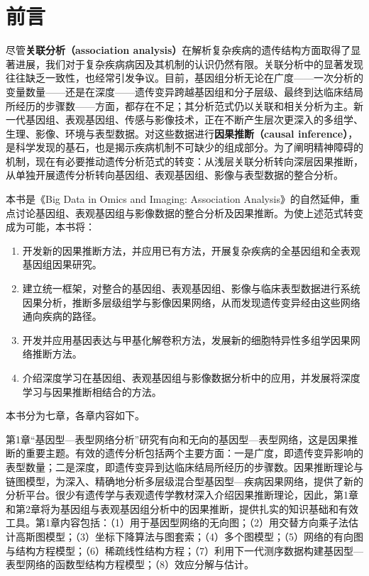 \chapter*{前言}

尽管\textbf{关联分析（association analysis）}在解析复杂疾病的遗传结构方面取得了显著进展，我们对于复杂疾病病因及其机制的认识仍然有限。关联分析中的显著发现往往缺乏一致性，也经常引发争议。目前，基因组分析无论在广度——一次分析的变量数量——还是在深度——遗传变异跨越基因组和分子层级、最终到达临床结局所经历的步骤数——方面，都存在不足；其分析范式仍以关联和相关分析为主。新一代基因组、表观基因组、传感与影像技术，正在不断产生层次更深入的多组学、生理、影像、环境与表型数据。对这些数据进行\textbf{因果推断（causal inference）}，是科学发现的基石，也是揭示疾病机制不可缺少的组成部分。为了阐明精神障碍的机制，现在有必要推动遗传分析范式的转变：从浅层关联分析转向深层因果推断，从单独开展遗传分析转向基因组、表观基因组、影像与表型数据的整合分析。

本书是《Big Data in Omics and Imaging: Association Analysis》的自然延伸，重点讨论基因组、表观基因组与影像数据的整合分析及因果推断。为使上述范式转变成为可能，本书将：
\begin{enumerate}[label=（\arabic*）]
\item 开发新的因果推断方法，并应用已有方法，开展复杂疾病的全基因组和全表观基因组因果研究。
\item 建立统一框架，对整合的基因组、表观基因组、影像与临床表型数据进行系统因果分析，推断多层级组学与影像因果网络，从而发现遗传变异经由这些网络通向疾病的路径。
\item 开发并应用基因表达与甲基化解卷积方法，发展新的细胞特异性多组学因果网络推断方法。
\item 介绍深度学习在基因组、表观基因组与影像数据分析中的应用，并发展将深度学习与因果推断相结合的方法。
\end{enumerate}

本书分为七章，各章内容如下。

第1章“基因型—表型网络分析”研究有向和无向的基因型—表型网络，这是因果推断的重要主题。有效的遗传分析包括两个主要方面：一是广度，即遗传变异影响的表型数量；二是深度，即遗传变异到达临床结局所经历的步骤数。因果推断理论与链图模型，为深入、精确地分析多层级混合型基因型—疾病因果网络，提供了新的分析平台。很少有遗传学与表观遗传学教材深入介绍因果推断理论，因此，第1章和第2章将为基因组与表观基因组分析中的因果推断，提供扎实的知识基础和有效工具。第1章内容包括：（1）用于基因型网络的无向图；（2）用交替方向乘子法估计高斯图模型；（3）坐标下降算法与图套索；（4）多个图模型；（5）网络的有向图与结构方程模型；（6）稀疏线性结构方程；（7）利用下一代测序数据构建基因型—表型网络的函数型结构方程模型；（8）效应分解与估计。

